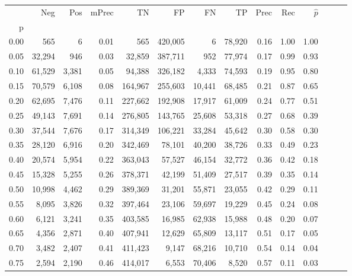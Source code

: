 \begin{tabular}{rrrrrrrrrrrrrr}
\toprule
{} &     Neg &    Pos & mPrec &       TN &       FP &      FN &      TP &  Prec &   Rec & $\hat{p}$ \\
p    &         &        &       &          &          &         &         &       &       &           \\
\midrule
0.00 &     565 &      6 &  0.01 &      565 &  420,005 &       6 &  78,920 &  0.16 &  1.00 &      1.00 \\
0.05 &  32,294 &    946 &  0.03 &   32,859 &  387,711 &     952 &  77,974 &  0.17 &  0.99 &      0.93 \\
0.10 &  61,529 &  3,381 &  0.05 &   94,388 &  326,182 &   4,333 &  74,593 &  0.19 &  0.95 &      0.80 \\
0.15 &  70,579 &  6,108 &  0.08 &  164,967 &  255,603 &  10,441 &  68,485 &  0.21 &  0.87 &      0.65 \\
0.20 &  62,695 &  7,476 &  0.11 &  227,662 &  192,908 &  17,917 &  61,009 &  0.24 &  0.77 &      0.51 \\
0.25 &  49,143 &  7,691 &  0.14 &  276,805 &  143,765 &  25,608 &  53,318 &  0.27 &  0.68 &      0.39 \\
0.30 &  37,544 &  7,676 &  0.17 &  314,349 &  106,221 &  33,284 &  45,642 &  0.30 &  0.58 &      0.30 \\
0.35 &  28,120 &  6,916 &  0.20 &  342,469 &   78,101 &  40,200 &  38,726 &  0.33 &  0.49 &      0.23 \\
0.40 &  20,574 &  5,954 &  0.22 &  363,043 &   57,527 &  46,154 &  32,772 &  0.36 &  0.42 &      0.18 \\
0.45 &  15,328 &  5,255 &  0.26 &  378,371 &   42,199 &  51,409 &  27,517 &  0.39 &  0.35 &      0.14 \\
0.50 &  10,998 &  4,462 &  0.29 &  389,369 &   31,201 &  55,871 &  23,055 &  0.42 &  0.29 &      0.11 \\
0.55 &   8,095 &  3,826 &  0.32 &  397,464 &   23,106 &  59,697 &  19,229 &  0.45 &  0.24 &      0.08 \\
0.60 &   6,121 &  3,241 &  0.35 &  403,585 &   16,985 &  62,938 &  15,988 &  0.48 &  0.20 &      0.07 \\
0.65 &   4,356 &  2,871 &  0.40 &  407,941 &   12,629 &  65,809 &  13,117 &  0.51 &  0.17 &      0.05 \\
0.70 &   3,482 &  2,407 &  0.41 &  411,423 &    9,147 &  68,216 &  10,710 &  0.54 &  0.14 &      0.04 \\
0.75 &   2,594 &  2,190 &  0.46 &  414,017 &    6,553 &  70,406 &   8,520 &  0.57 &  0.11 &      0.03 \\

\end{tabular}
